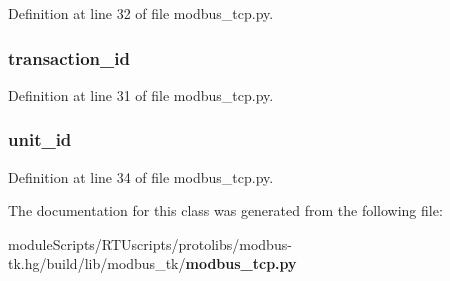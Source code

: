Definition at line 32 of file modbus\+\_\+tcp.\+py.

\subsubsection[{transaction\+\_\+id}]{\setlength{\rightskip}{0pt plus 5cm}transaction\+\_\+id}\label{classmodbus__tk_1_1modbus__tcp_1_1_tcp_mbap_a36c52c43812f4c850ae2094cb198048e}


Definition at line 31 of file modbus\+\_\+tcp.\+py.

\subsubsection[{unit\+\_\+id}]{\setlength{\rightskip}{0pt plus 5cm}unit\+\_\+id}\label{classmodbus__tk_1_1modbus__tcp_1_1_tcp_mbap_a072eb291d69b95d3654bf4e5a04059f9}


Definition at line 34 of file modbus\+\_\+tcp.\+py.



The documentation for this class was generated from the following file\+:\begin{DoxyCompactItemize}
\item 
module\+Scripts/\+R\+T\+Uscripts/protolibs/modbus-\/tk.\+hg/build/lib/modbus\+\_\+tk/{\bf modbus\+\_\+tcp.\+py}\end{DoxyCompactItemize}
